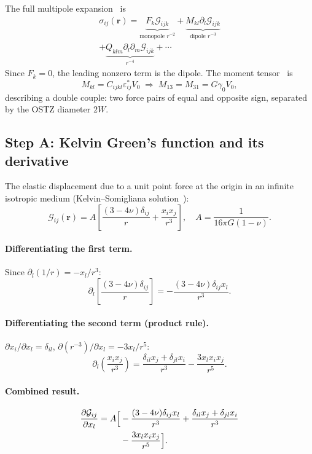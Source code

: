 \documentclass[5p,sort&compress]{elsarticle}
\newcommand{\gz}{\gamma_0}
\begin{document}
The full multipole expansion~\cite{mura1987} is
\begin{multline}
  \sigma_{ij}(\mathbf r)=
  \underbrace{F_k\mathcal G_{ijk}}_{\text{monopole }r^{-2}}
  +\underbrace{M_{kl}\partial_l\mathcal G_{ijk}}_{\text{dipole }r^{-3}}
  \\+\underbrace{Q_{klm}\partial_l\partial_m\mathcal G_{ijk}}_{r^{-4}}
  +\cdots
  \label{eq:multipole}
\end{multline}
Since $F_k=0$, the leading nonzero term is the dipole. The moment
tensor~\cite{mura1987} is
\begin{equation}
  M_{kl}=C_{ijkl}\varepsilon^*_{ij}V_0\;\Rightarrow\;
  M_{13}=M_{31}=G\gz V_0,
  \label{eq:moment}
\end{equation}
describing a double couple: two force pairs of equal and opposite sign,
separated by the OSTZ diameter $2W$.

\subsection{Step A: Kelvin Green's function and its derivative}
\label{sec:stepA}

The elastic displacement due to a unit point force at the origin in an
infinite isotropic medium (Kelvin--Somigliana solution~\cite{mura1987}):
\begin{equation}
  \mathcal G_{ij}(\mathbf r)=A\!\left[\frac{(3-4\nu)\delta_{ij}}{r}
  +\frac{x_ix_j}{r^3}\right],\quad A=\frac{1}{16\pi G(1-\nu)}.
  \label{eq:Gij}
\end{equation}

\paragraph{Differentiating the first term.}
Since $\partial_l(1/r)=-x_l/r^3$:
\[
  \partial_l\!\left[\frac{(3-4\nu)\delta_{ij}}{r}\right]
  =-\frac{(3-4\nu)\delta_{ij}x_l}{r^3}.
\]

\paragraph{Differentiating the second term (product rule).}
$\partial x_i/\partial x_l=\delta_{il}$, $\partial(r^{-3})/\partial x_l=-3x_l/r^5$:
\[
  \partial_l\!\left(\frac{x_ix_j}{r^3}\right)
  =\frac{\delta_{il}x_j+\delta_{jl}x_i}{r^3}-\frac{3x_lx_ix_j}{r^5}.
\]

\paragraph{Combined result.}
\begin{align}
  \frac{\partial\mathcal G_{ij}}{\partial x_l}
  =A\Bigl[&-\frac{(3-4\nu)\delta_{ij}x_l}{r^3}
    +\frac{\delta_{il}x_j+\delta_{jl}x_i}{r^3}
    \notag\\
  &-\frac{3x_lx_ix_j}{r^5}\Bigr].
  \label{eq:dG}
\end{align}
\end{document}
